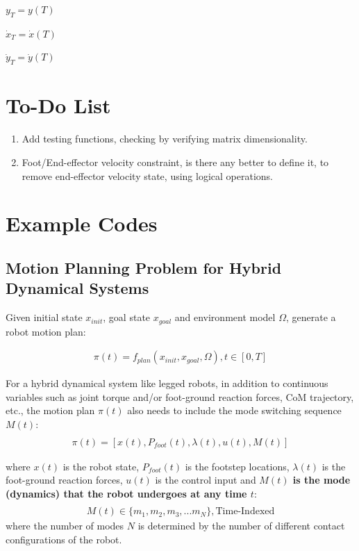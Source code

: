 \documentclass[a4paper,10pt]{article}
\begin{document}
$y_T = y(T)$

$\dot{x}_T = \dot{x}(T)$

$\dot{y}_T = \dot{y}(T)$

\vspace{3mm}

\section{To-Do List}
\begin{enumerate}
	\item Add testing functions, checking by verifying matrix dimensionality.
	\item Foot/End-effector velocity constraint, is there any better to define it, to remove end-effector velocity state, using logical operations.
\end{enumerate}

\section{Example Codes}

\subsection{Motion Planning Problem for Hybrid Dynamical Systems}

Given initial state $x_{init}$, goal state $x_{goal}$ and environment model $\Omega$, generate a robot motion plan:

\begin{align}
	\pi(t) = f_{plan}(x_{init},x_{goal},\Omega), t \in [0,T]
\end{align}

For a hybrid dynamical system like legged robots, in addition to continuous variables such as joint torque and/or foot-ground reaction forces, CoM trajectory, etc., the motion plan $\pi(t)$ also needs to include the mode switching sequence $M(t)$:
\begin{align}
	\\ \pi(t) = [x(t), P_{foot}(t), \lambda(t), u(t), M(t)]
\end{align}

where $x(t)$ is the robot state, $P_{foot}(t)$ is the footstep locations, $\lambda(t)$ is the foot-ground reaction forces, $u(t)$ is the control input and \textbf{$M(t)$ is the mode (dynamics) that the robot undergoes at any time $t$}:
\begin{align}
	\\ M(t) \in \{m_1,m_2,m_3,...m_N\}, \text{Time-Indexed}
\end{align}
where the number of modes $N$ is determined by the number of different contact configurations of the robot.
\end{document}
